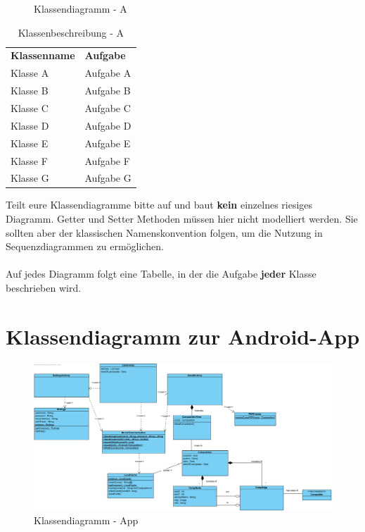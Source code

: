 \begin{figure}[h]
	\centering
	\caption{Klassendiagramm - A}
	\label{fig:klassendiagramm-a}
\end{figure}

\begin{table}[h]
	\centering
	\begin{tabularx}{\textwidth}{X X}
		\rowcolor[HTML]{C0C0C0} 
		\textbf{Klassenname} & \textbf{Aufgabe} \\
		Klasse A & Aufgabe A \\
		\rowcolor[HTML]{E7E7E7} 
		Klasse B & Aufgabe B \\
		Klasse C & Aufgabe C \\
		\rowcolor[HTML]{E7E7E7} 
		Klasse D & Aufgabe D \\
		Klasse E & Aufgabe E \\
		\rowcolor[HTML]{E7E7E7} 
		Klasse F & Aufgabe F \\
		Klasse G & Aufgabe G
	\end{tabularx}
	\caption{Klassenbeschreibung - A}
	\label{table:klassenbeschreibung-a}
\end{table}

\begin{tcolorbox}
Teilt eure Klassendiagramme bitte auf und baut \textbf{kein} einzelnes riesiges Diagramm.
Getter und Setter Methoden müssen hier nicht modelliert werden.
Sie sollten aber der klassischen Namenskonvention folgen, um die Nutzung in Sequenzdiagrammen zu ermöglichen.
\\\\
Auf jedes Diagramm folgt eine Tabelle, in der die Aufgabe \textbf{jeder} Klasse beschrieben wird.
\end{tcolorbox}

\section*{Klassendiagramm zur Android-App}

\begin{figure}[h]
	\centering
	\includegraphics[width= \linewidth]{img/cdapp.png}
	\caption{Klassendiagramm - App}
	\label{fig:klassendiagramm-a}
\end{figure}

